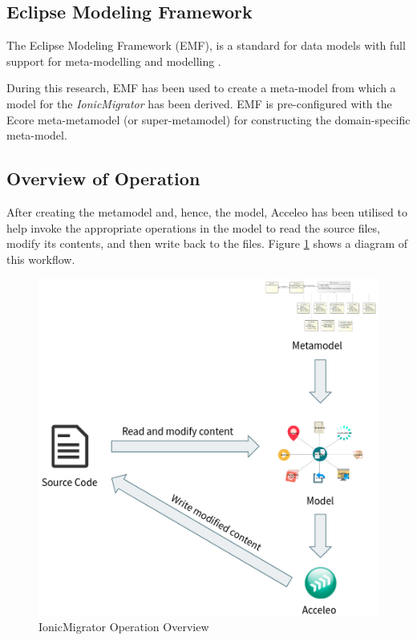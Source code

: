 \documentclass[conference]{IEEEtran}
\begin{document}
\subsection{Eclipse Modeling Framework}

The Eclipse Modeling Framework (EMF), is a standard for data models with full support for meta-modelling and modelling \cite{b11}.

During this research, EMF has been used to create a meta-model from which a model for the \textit{IonicMigrator} has been derived. EMF is pre-configured with the Ecore meta-metamodel (or super-metamodel) for constructing the domain-specific meta-model.

\subsection{Overview of Operation}

After creating the metamodel and, hence, the model, Acceleo has been utilised to help invoke the appropriate operations in the model to read the source files, modify its contents, and then write back to the files. Figure \ref{fig:operation} shows a diagram of this workflow.

\begin{figure}[htbp]
\centerline{\includegraphics[width=\linewidth,keepaspectratio]{workflow.png}}
\caption{IonicMigrator Operation Overview}
\label{fig:operation}
\end{figure}
\end{document}
